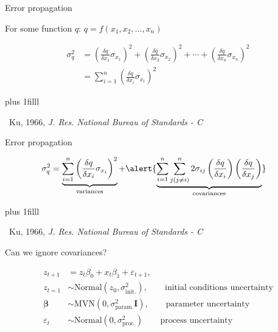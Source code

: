\documentclass[12pt, compress, aspectratio=1610]{beamer}
\newcommand{\btVFill}{\vskip0pt plus 1filll}
\newcommand{\credit}[1]{\btVFill\par\hfill \footnotesize ~#1}
\begin{document}
\begin{frame}{%
\protect\hypertarget{error-propagation}{%
Error propagation}}

For some function \(q\): \(q = f(x_1,x_2,\dots,x_n)\)

\begin{align*}
\sigma^2_q &= \left( \frac{\delta q}{\delta x_1} \sigma_{x_1} \right)^2 + \left( \frac{\delta q}{\delta x_2} \sigma_{x_2} \right)^2 + \cdots + \left( \frac{\delta q}{\delta x_n} \sigma_{x_n} \right)^2 \\
&= \sum^n_{i=1}\left( \frac{\delta q}{\delta x_i} \sigma_{x_i} \right)^2
\end{align*}

\credit{Ku, 1966, \emph{J. Res. National Bureau of Standards - C}}

\end{frame}

\begin{frame}{%
\protect\hypertarget{error-propagation-1}{%
Error propagation}}

\begin{align*}
\sigma^2_q &= \underbrace{\sum^n_{i=1}\left( \frac{\delta q}{\delta x_i} \sigma_{x_i} \right)^2}_{\text{variances}} + \alert{\underbrace{\sum^n_{i=1} \sum^n_{j(j \ne i)} 2 \sigma_{ij}\left( \frac{\delta q}{\delta x_i} \right)\left( \frac{\delta q}{\delta x_j} \right)}_{\text{covariances}}}
\end{align*}

\credit{Ku, 1966, \emph{J. Res. National Bureau of Standards - C}}

\end{frame}

\begin{frame}{%
\protect\hypertarget{can-we-ignore-covariances}{%
Can we ignore covariances?}}

\begin{align*}
z_{t+1} &= z_{t} \beta_0 + x_t \beta_1 + \varepsilon_{t+1}, \\
z_{t=1} &\sim \text{Normal}(z_0, \sigma^2_{\text{init.}}), \qquad \scriptstyle\text{initial conditions uncertainty} \\
\mathbf{\beta} &\sim \text{MVN}(0, \sigma^2_{\text{param.}} \mathbf{I}), \qquad \scriptstyle\text{parameter uncertainty} \\
\varepsilon_t &\sim \text{Normal}(0, \sigma^2_{\text{proc.}}) \qquad \scriptstyle\text{process uncertainty}
\end{align*}

\end{frame}
\end{document}
